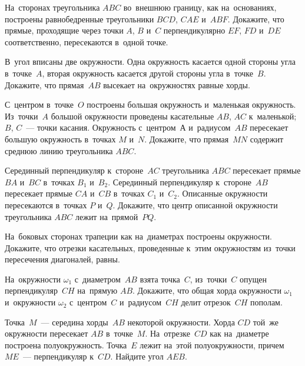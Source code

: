 \iffalse %


\item
На~сторонах треугольника $ABC$ во~внешнюю границу, как на~основаниях, построены
равнобедренные треугольники $BCD$, $CAE$ и~$ABF$.
Докажите, что прямые, проходящие через точки $A$, $B$ и~$C$ перпендикулярно
$EF$, $FD$ и~$DE$ соответственно, пересекаются в~одной точке.

\item
В~угол вписаны две окружности.
Одна окружность касается одной стороны угла в~точке~$A$, вторая окружность
касается другой стороны угла в~точке~$B$.
Докажите, что прямая~$AB$ высекает на~окружностях равные хорды.

\item
С~центром в~точке~$O$ построены большая окружность и~маленькая окружность.
Из~точки~$A$ большой окружности проведены касательные $AB$, $AC$ к~маленькой;
$B$, $C$~--- точки касания.
Окружность с~центром~$А$ и~радиусом~$AB$ пересекает большую окружность
в~точках $M$ и~$N$.
Докажите, что прямая~$MN$ содержит среднюю линию треугольника $ABC$.

\item
Серединный перпендикуляр к~стороне~$AC$ треугольника $ABC$ пересекает
прямые $BA$ и~$BC$ в~точках $B_1$ и~$B_2$.
Серединный перпендикуляр к~стороне~$AB$ пересекает прямые $CA$ и~$CB$
в~точках $C_1$ и~$C_2$.
Описанные окружности пересекаются в~точках $P$ и~$Q$.
Докажите, что центр описанной окружности треугольника $ABC$ лежит
на~прямой~$PQ$.

\item
На~боковых сторонах трапеции как на~диаметрах построены окружности.
Докажите, что отрезки касательных, проведенные к~этим окружностям из~точки
пересечения диагоналей, равны.

\item
На~окружности $\omega_1$ с~диаметром~$AB$ взята точка~$C$, из~точки~$C$ опущен
перпендикуляр~$CH$ на~прямую $AB$.
Докажите, что общая хорда окружности $\omega_1$ и~окружности $\omega_2$
с~центром~$C$ и~радиусом~$CH$ делит отрезок~$CH$ пополам.

\item
Точка~$M$~--- середина хорды~$AB$ некоторой окружности.
Хорда $CD$ той~же окружности пересекает $AB$ в~точке~$M$.
На~отрезке~$CD$ как на~диаметре построена полуокружность.
Точка~$E$ лежит на~этой полуокружности, причем~$ME$~--- перпендикуляр к~$CD$.
Найдите угол $AEB$.

